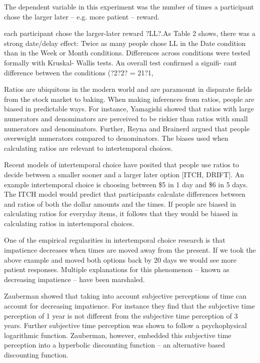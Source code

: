 \documentclass[]{article}
\begin{document}
The dependent variable in this experiment was the number of times a participant chose the larger later -- e.g. more patient -- reward. 

each participant chose the larger-later reward ?LL?.As Table 2 shows, there was a strong date/delay effect: Twice as many people chose LL in the Date condition than in the Week or Month conditions. Differences across conditions were tested formally with Kruskal- Wallis tests. An overall test confirmed a signifi- cant difference between the conditions (?2?2? = 21?1,






Ratios are ubiquitous in the modern world and are paramount in disparate fields from the stock market to baking. 
When making inferences from ratios, people are biased in predictable ways.
For instance, Yamagishi showed that ratios with large numerators and denominators are perceived to be riskier than ratios with small numerators and denominators. Further, Reyna and Brainerd argued that people overweight numerators compared to denominators.
The biases used when calculating ratios are relevant to intertemporal choices. 

Recent models of intertemporal choice have posited that people use ratios to decide between a smaller sooner and a larger later option [ITCH, DRIFT]. 
An example intertemporal choice is choosing between \$5 in 1 day and \$6 in 5 days. 
The ITCH model would predict that participants calculate differences between and ratios of both the dollar amounts and the times. 
If people are biased in calculating ratios for everyday items, it follows that they would be biased in calculating ratios in intertemporal choices. 

One of the empirical regularities in intertemporal choice research is that impatience decreases when times are moved away from the present.
If we took the above example and moved both options back by 20 days we would see more patient responses. 
Multiple explanations for this phenomenon -- known as decreasing impatience -- have been marshaled. 

Zauberman showed that taking into account subjective perceptions of time can account for decreasing impatience. 
For instance they find that the subjective time perception of 1 year is not different from the subjective time perception of 3 years. 
Further subjective time perception was shown to follow a psychophysical logarithmic function. Zauberman, however, embedded this subjective time perception into a hyperbolic discounting function – an alternative based discounting function.  
\end{document}
